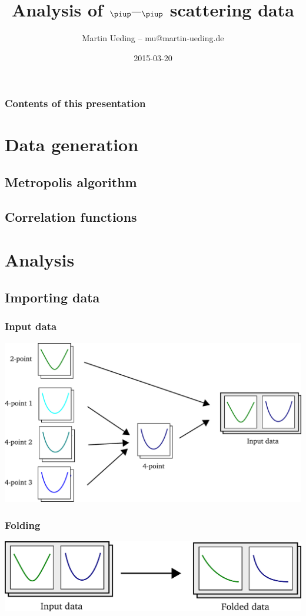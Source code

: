 \documentclass[english, fleqn]{beamer}
\title{Analysis of $\piup$--$\piup$ scattering data}
\author{Martin Ueding – mu@martin-ueding.de}
\date{2015-03-20}
\begin{document}
\nocite{Knippschild/Pi_Pi_Scattering}

\begin{frame}
    \titlepage
\end{frame}

\begin{frame}
    \frametitle{Contents of this presentation}
    \tableofcontents
\end{frame}

\section{Data generation}

\subsection{Metropolis algorithm}

\subsection{Correlation functions}


\section{Analysis}

\newcommand\scale{0.2}

\subsection{Importing data}

\begin{frame}
    \frametitle{Input data}
    \includegraphics[scale=\scale]{sketches/01-input.pdf}
\end{frame}

\begin{frame}
    \frametitle{Folding}
    \includegraphics[scale=\scale]{sketches/02-folding.pdf}
\end{frame}
\end{document}
